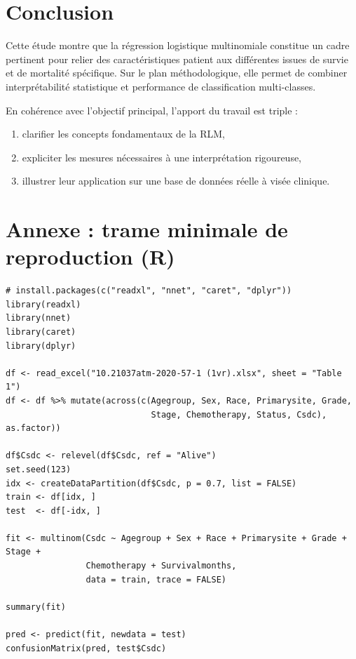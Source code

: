 \documentclass[12pt,a4paper]{article}
\begin{document}
\begin{itemize}
\section{Conclusion}
Cette étude montre que la régression logistique multinomiale constitue un cadre pertinent pour relier des caractéristiques patient aux différentes issues de survie et de mortalité spécifique. Sur le plan méthodologique, elle permet de combiner interprétabilité statistique et performance de classification multi-classes.

En cohérence avec l'objectif principal, l'apport du travail est triple :
\begin{enumerate}[label=\arabic*.]
    \item clarifier les concepts fondamentaux de la RLM,
    \item expliciter les mesures nécessaires à une interprétation rigoureuse,
    \item illustrer leur application sur une base de données réelle à visée clinique.
\end{enumerate}

\section*{Annexe : trame minimale de reproduction (R)}
\begin{verbatim}
# install.packages(c("readxl", "nnet", "caret", "dplyr"))
library(readxl)
library(nnet)
library(caret)
library(dplyr)

df <- read_excel("10.21037atm-2020-57-1 (1vr).xlsx", sheet = "Table 1")
df <- df %>% mutate(across(c(Agegroup, Sex, Race, Primarysite, Grade,
                             Stage, Chemotherapy, Status, Csdc), as.factor))

df$Csdc <- relevel(df$Csdc, ref = "Alive")
set.seed(123)
idx <- createDataPartition(df$Csdc, p = 0.7, list = FALSE)
train <- df[idx, ]
test  <- df[-idx, ]

fit <- multinom(Csdc ~ Agegroup + Sex + Race + Primarysite + Grade + Stage +
                Chemotherapy + Survivalmonths,
                data = train, trace = FALSE)

summary(fit)

pred <- predict(fit, newdata = test)
confusionMatrix(pred, test$Csdc)
\end{verbatim}


\end{itemize}
\end{document}
